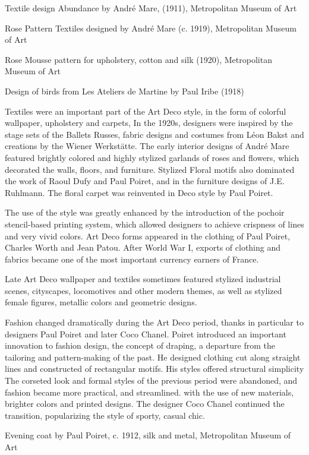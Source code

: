 Textile design Abundance by André Mare, (1911), Metropolitan Museum of
Art

Rose Pattern Textiles designed by André Mare (c. 1919), Metropolitan
Museum of Art

Rose Mousse pattern for upholstery, cotton and silk (1920), Metropolitan
Museum of Art

Design of birds from Les Ateliers de Martine by Paul Iribe (1918)

Textiles were an important part of the Art Deco style, in the form of
colorful wallpaper, upholstery and carpets, In the 1920s, designers were
inspired by the stage sets of the Ballets Russes, fabric designs and
costumes from Léon Bakst and creations by the Wiener Werkstätte. The
early interior designs of André Mare featured brightly colored and
highly stylized garlands of roses and flowers, which decorated the
walls, floors, and furniture. Stylized Floral motifs also dominated the
work of Raoul Dufy and Paul Poiret, and in the furniture designs of J.E.
Ruhlmann. The floral carpet was reinvented in Deco style by Paul Poiret.

The use of the style was greatly enhanced by the introduction of the
pochoir stencil-based printing system, which allowed designers to
achieve crispness of lines and very vivid colors. Art Deco forms
appeared in the clothing of Paul Poiret, Charles Worth and Jean Patou.
After World War I, exports of clothing and fabrics became one of the
most important currency earners of France.

Late Art Deco wallpaper and textiles sometimes featured stylized
industrial scenes, cityscapes, locomotives and other modern themes, as
well as stylized female figures, metallic colors and geometric designs.

Fashion changed dramatically during the Art Deco period, thanks in
particular to designers Paul Poiret and later Coco Chanel. Poiret
introduced an important innovation to fashion design, the concept of
draping, a departure from the tailoring and pattern-making of the past.
He designed clothing cut along straight lines and constructed of
rectangular motifs. His styles offered structural simplicity The
corseted look and formal styles of the previous period were abandoned,
and fashion became more practical, and streamlined. with the use of new
materials, brighter colors and printed designs. The designer Coco Chanel
continued the transition, popularizing the style of sporty, casual chic.

Evening coat by Paul Poiret, c. 1912, silk and metal, Metropolitan
Museum of Art

